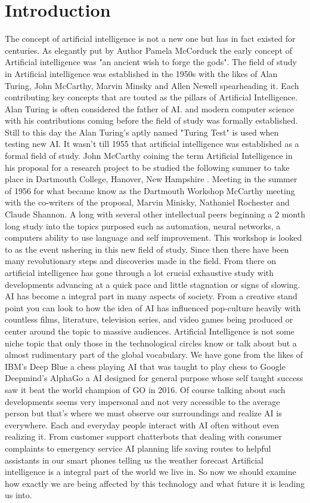 \documentclass[conference]{IEEEtran}
\begin{document}
\section{Introduction}
The concept of artificial intelligence is not a new one but has in fact existed for centuries. As elegantly put by Author Pamela McCorduck the early concept of Artificial intelligence was "an ancient wish to forge the gods"\cite{McCorduck}. The field of study in Artificial intelligence was established in the 1950s with the likes of Alan Turing, John McCarthy, Marvin Minsky and Allen Newell spearheading it. Each contributing key concepts that are touted as the pillars of Artificial Intelligence. Alan Turing is often considered the father of AI. and modern computer science with his contributions coming before the field of study was formally established. Still to this day the Alan Turing's aptly named "Turing Test" \cite{Turing} is used when testing new AI. It wasn't till 1955 that artificial intelligence was established as a formal field of study. John McCarthy coining the term Artificial Intelligence in his proposal for a research project to be studied the following summer to take place in Dartmouth College, Hanover, New Hampshire \cite{Dartmouth}. Meeting in the summer of 1956 for what became know as the Dartmouth Workshop McCarthy meeting with the co-writers of the proposal, Marvin Minisky, Nathaniel Rochester and Claude Shannon. A long with several other intellectual peers beginning a 2 month long study into the topics purposed such as automation, neural networks, a computers ability to use language and self improvement. This workshop is looked to as the event ushering in this new field of study. Since then there have been many revolutionary steps and discoveries made in the field. From there on artificial intelligence has gone through a lot crucial exhaustive study with developments advancing at a quick pace and little stagnation or signs of slowing. AI has become a integral part in many aspects of society. From a creative stand point you can look to how the idea of AI has influenced pop-culture heavily with countless films, literature, television series, and video games being produced or center around the topic to massive audiences. Artificial Intelligence is not some niche topic that only those in the technological circles know or talk about but a almost rudimentary part of the global vocabulary. We have gone from the likes of IBM's Deep Blue a chess playing AI that was taught to play chess to Google Deepmind's AlphaGo a AI designed for general purpose whose self taught success saw it beat the world champion of GO in 2016. Of course talking about such developments seems very impersonal and not very accessible to the average person but that's where we must observe our surroundings and realize AI is everywhere. Each and everyday people interact with AI often without even realizing it. From customer support chatterbots that dealing with consumer complaints to emergency service AI planning life saving routes to helpful assistants in our smart phones telling us the weather forecast Artificial intelligence is a integral part of the world we live in. So now we should examine how exactly we are being affected by this technology and what future it is leading us into. 
\end{document}
